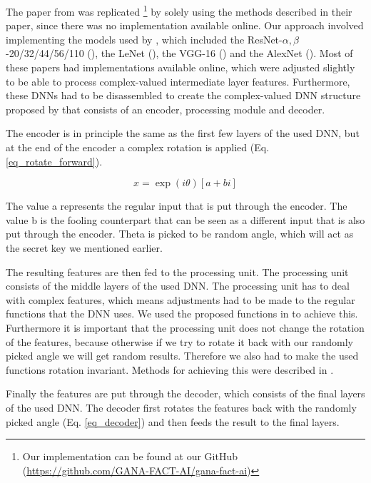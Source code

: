 The paper from \citet{xiang2020interpretable} was replicated \footnote{Our implementation can be found at our GitHub (\url{https://github.com/GANA-FACT-AI/gana-fact-ai})} by solely using the methods described in their paper, since there was no implementation available online. Our approach involved implementing the models used by \citet{xiang2020interpretable}, which included the ResNet-$\alpha,\beta$-20/32/44/56/110 (\citet{DBLP:journals/corr/HeZRS15}), the LeNet (\citet{lecun1998gradient}), the VGG-16 (\citet{simonyan2015deep}) and the AlexNet (\citet{NIPS2012_c399862d}). Most of these papers had implementations available online, which were adjusted slightly to be able to process complex-valued intermediate layer features. Furthermore, these DNNs had to be disassembled to create the complex-valued DNN structure proposed by \citet{xiang2020interpretable} that consists of an encoder, processing module and decoder.

The encoder is in principle the same as the first few layers of the used DNN, but at the end of the encoder a complex rotation is applied (Eq. \ref{eq_rotate_forward}).

\begin{equation}
    x = \exp(i\theta)[a+bi]
    \label{eq_rotate_forward}
\end{equation}

The value a represents the regular input that is put through the encoder. The value b is the fooling counterpart that can be seen as a different input that is also put through the encoder. Theta is picked to be random angle, which will act as the secret key we mentioned earlier.

The resulting features are then fed to the processing unit. The processing unit consists of the middle layers of the used DNN. The processing unit has to deal with complex features, which means adjustments had to be made to the regular functions that the DNN uses. We used the proposed functions in \citet{DBLP:journals/corr/TrabelsiBSSSMRB17} to achieve this. Furthermore it is important that the processing unit does not change the rotation of the features, because otherwise if we try to rotate it back with our randomly picked angle we will get random results. Therefore we also had to make the used functions rotation invariant. Methods for achieving this were described in \citet{xiang2020interpretable}.

Finally the features are put through the decoder, which consists of the final layers of the used DNN. The decoder first rotates the features back with the randomly picked angle (Eq. \ref{eq_decoder}) and then feeds the result to the final layers.

